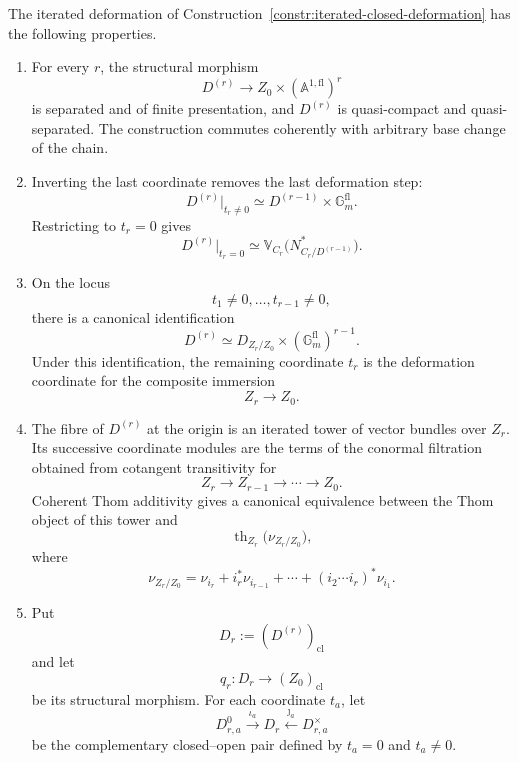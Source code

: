 \begin{proposition}
\label{prop:iterated-deformation-faces}
The iterated deformation of
Construction~\ref{constr:iterated-closed-deformation} has the following
properties.

\begin{enumerate}
    \item For every \(r\), the structural morphism
    \[
        D^{(r)}
        \longrightarrow
        Z_0\times
        (\mathbb A^{1,\mathrm{fl}})^r
    \]
    is separated and of finite presentation, and \(D^{(r)}\) is
    quasi-compact and quasi-separated.  The construction commutes
    coherently with arbitrary base change of the chain.

    \item Inverting the last coordinate removes the last deformation step:
    \[
        D^{(r)}|_{t_r\neq0}
        \simeq
        D^{(r-1)}
        \times
        \mathbb G_m^{\mathrm{fl}}.
    \]
    Restricting to \(t_r=0\) gives
    \[
        D^{(r)}|_{t_r=0}
        \simeq
        \mathbb V_{C_r}
        \bigl(
          N^*_{C_r/D^{(r-1)}}
        \bigr).
    \]

    \item On the locus
    \[
        t_1\neq0,\ldots,t_{r-1}\neq0,
    \]
    there is a canonical identification
    \[
        D^{(r)}
        \simeq
        D_{Z_r/Z_0}
        \times
        (\mathbb G_m^{\mathrm{fl}})^{r-1}.
    \]
    Under this identification, the remaining coordinate \(t_r\) is the
    deformation coordinate for the composite immersion
    \[
        Z_r\longrightarrow Z_0.
    \]

    \item The fibre of \(D^{(r)}\) at the origin is an iterated tower of
    vector bundles over \(Z_r\).  Its successive coordinate modules are
    the terms of the conormal filtration obtained from cotangent
    transitivity for
    \[
        Z_r\longrightarrow Z_{r-1}
        \longrightarrow\cdots\longrightarrow Z_0.
    \]
    Coherent Thom additivity gives a canonical equivalence between the
    Thom object of this tower and
    \[
        \operatorname{th}_{Z_r}
        \bigl(
          \nu_{Z_r/Z_0}
        \bigr),
    \]
    where
    \[
        \nu_{Z_r/Z_0}
        =
        \nu_{i_r}
        +
        i_r^*\nu_{i_{r-1}}
        +\cdots+
        (i_2\cdots i_r)^*\nu_{i_1}.
    \]

    \item Put
    \[
        D_r:=(D^{(r)})_{\mathrm{cl}}
    \]
    and let
    \[
        q_r:D_r\longrightarrow (Z_0)_{\mathrm{cl}}
    \]
    be its structural morphism.  For each coordinate \(t_a\), let
    \[
        D_{r,a}^0\xrightarrow{\iota_a}D_r
        \xleftarrow{\jmath_a}D_{r,a}^{\times}
    \]
    be the complementary closed--open pair defined by
    \(t_a=0\) and \(t_a\neq0\).


\end{enumerate}
\end{proposition}
